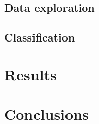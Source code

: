 \documentclass[letterpaper,11pt,leqno]{article}
\newcommand{\bib}{bibliography.bib}
\begin{document}
\subsection{Data exploration}

\subsection{Classification}

\section{Results}\label{s:results}

\section{Conclusions}\label{s:conclusions}




\end{document}
